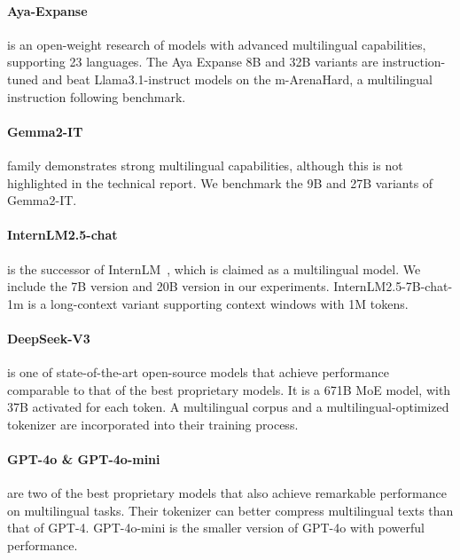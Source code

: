 \paragraph{Aya-Expanse~\cite{dang2024aya}} is an open-weight research of models with advanced multilingual capabilities, supporting 23 languages.
The Aya Expanse 8B and 32B variants are instruction-tuned and beat Llama3.1-instruct models on the m-ArenaHard, a multilingual instruction following benchmark.



\paragraph{Gemma2-IT~\cite{team2024gemma}} family demonstrates strong multilingual capabilities, although this is not highlighted in the technical report.
We benchmark the 9B and 27B variants of Gemma2-IT.

\paragraph{InternLM2.5-chat~\cite{cai2024internlm2}} is the successor of InternLM~\cite{team2023internlm}, which is claimed as a multilingual model.
We include the 7B version and 20B version in our experiments.
InternLM2.5-7B-chat-1m is a long-context variant supporting context windows with 1M tokens.


\paragraph{DeepSeek-V3~\cite{DeepSeekAI2024DeepSeekV3TR}} is one of state-of-the-art open-source models that achieve performance comparable to that of the best proprietary models.
It is a 671B MoE model, with 37B activated for each token.
A multilingual corpus and a multilingual-optimized tokenizer are incorporated into their training process.

\paragraph{GPT-4o \& GPT-4o-mini~\cite{openai2024gpt4o}} are two of the best proprietary models that also achieve remarkable performance on multilingual tasks.
Their tokenizer can better compress multilingual texts than that of GPT-4.
GPT-4o-mini is the smaller version of GPT-4o with powerful performance.

